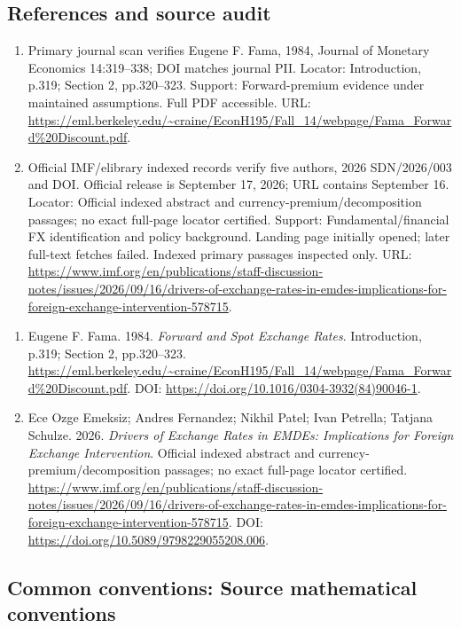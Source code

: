 \documentclass[11pt,a4paper]{article}
\begin{document}
\subsection*{References and source audit}
\begin{enumerate}
\item Primary journal scan verifies Eugene F. Fama, 1984, Journal of Monetary Economics 14:319--338; DOI matches journal PII. Locator: Introduction, p.319; Section 2, pp.320--323. Support: Forward-premium evidence under maintained assumptions. Full PDF accessible. URL: \url{https://eml.berkeley.edu/~craine/EconH195/Fall_14/webpage/Fama_Forward%20Discount.pdf}.
\item Official IMF/elibrary indexed records verify five authors, 2026 SDN/2026/003 and DOI. Official release is September 17, 2026; URL contains September 16. Locator: Official indexed abstract and currency-premium/decomposition passages; no exact full-page locator certified. Support: Fundamental/financial FX identification and policy background. Landing page initially opened; later full-text fetches failed. Indexed primary passages inspected only. URL: \url{https://www.imf.org/en/publications/staff-discussion-notes/issues/2026/09/16/drivers-of-exchange-rates-in-emdes-implications-for-foreign-exchange-intervention-578715}.
\end{enumerate}
\begin{enumerate}\raggedright
\item\hypertarget{definitions:source:30007614:1}{} Eugene F. Fama. 1984. \emph{Forward and Spot Exchange Rates}. Introduction, p.319; Section 2, pp.320--323.
\url{https://eml.berkeley.edu/~craine/EconH195/Fall_14/webpage/Fama_Forward%20Discount.pdf}.
DOI: \url{https://doi.org/10.1016/0304-3932(84)90046-1}.
\item\hypertarget{definitions:source:30007614:2}{} Ece Ozge Emeksiz; Andres Fernandez; Nikhil Patel; Ivan Petrella; Tatjana Schulze. 2026. \emph{Drivers of Exchange Rates in EMDEs: Implications for Foreign Exchange Intervention}. Official indexed abstract and currency-premium/decomposition passages; no exact full-page locator certified.
\url{https://www.imf.org/en/publications/staff-discussion-notes/issues/2026/09/16/drivers-of-exchange-rates-in-emdes-implications-for-foreign-exchange-intervention-578715}.
DOI: \url{https://doi.org/10.5089/9798229055208.006}.
\end{enumerate}

\subsection*{Common conventions: Source mathematical conventions}
\end{document}
